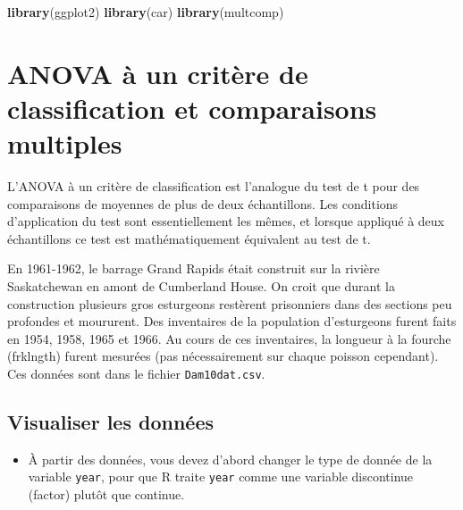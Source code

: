 \documentclass[
  12pt,
]{book}
\newenvironment{Shaded}{\begin{snugshade}}{\end{snugshade}}
\newcommand{\KeywordTok}[1]{\textcolor[rgb]{0.13,0.29,0.53}{\textbf{#1}}}
\newcommand{\NormalTok}[1]{#1}
\newcommand{\OperatorTok}[1]{\textcolor[rgb]{0.81,0.36,0.00}{\textbf{#1}}}
\newcommand{\StringTok}[1]{\textcolor[rgb]{0.31,0.60,0.02}{#1}}
\providecommand{\tightlist}{%
  \setlength{\itemsep}{0pt}\setlength{\parskip}{0pt}}
\begin{document}
\begin{Shaded}
\begin{Highlighting}[]
\KeywordTok{library}\NormalTok{(ggplot2)}
\KeywordTok{library}\NormalTok{(car)}
\KeywordTok{library}\NormalTok{(multcomp)}
\end{Highlighting}
\end{Shaded}

\hypertarget{anova-uxe0-un-crituxe8re-de-classification-et-comparaisons-multiples}{%
\section{ANOVA à un critère de classification et comparaisons multiples}\label{anova-uxe0-un-crituxe8re-de-classification-et-comparaisons-multiples}}

L'ANOVA à un critère de classification est l'analogue du test de t pour des comparaisons de moyennes de plus de deux échantillons. Les conditions d'application du test sont essentiellement les mêmes, et lorsque appliqué à deux échantillons ce test est mathématiquement équivalent au test de t.

En 1961-1962, le barrage Grand Rapids était construit sur la rivière Saskatchewan en amont de Cumberland House. On croit que durant la construction plusieurs gros esturgeons restèrent prisonniers dans des sections peu profondes et moururent. Des inventaires de la population d'esturgeons furent faits en 1954, 1958, 1965 et 1966. Au cours de ces inventaires, la longueur à la fourche (frklngth) furent mesurées (pas nécessairement sur chaque poisson cependant). Ces données sont dans le fichier \texttt{Dam10dat.csv}.

\hypertarget{visualiser-les-donnuxe9es}{%
\subsection{Visualiser les données}\label{visualiser-les-donnuxe9es}}

\begin{itemize}
\tightlist
\item
  À partir des données, vous devez d'abord changer le type de donnée de la variable \texttt{year}, pour que R traite \texttt{year} comme une variable discontinue (factor) plutôt que continue.
\end{itemize}

\begin{Shaded}
\end{Shaded}
\end{document}
